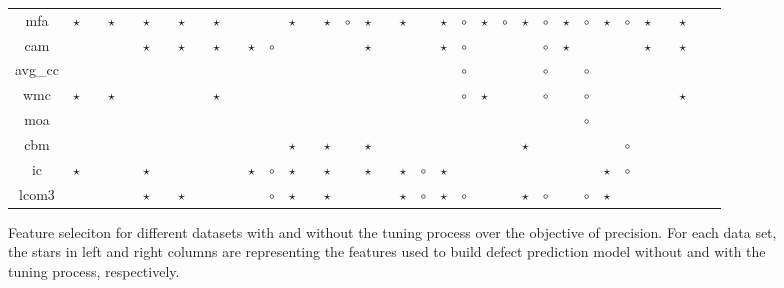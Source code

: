 \begin{figure*}[!ht]
\begin{tabular}{c|c c|c c|c c|c c|c c|c c|c c|c c|c c|c c|c c|c c|c c|c c|c c|c c|c c|c }
mfa& $\star$& & $\star$& & $\star$& & $\star$& & $\star$& & & & $\star$& & $\star$& $\circ$& $\star$& & $\star$& & $\star$& $\circ$& $\star$& $\circ$& $\star$& $\circ$& $\star$& $\circ$& $\star$& $\circ$& $\star$& & $\star$& \\
cam& & & & & $\star$& & $\star$& & $\star$& & $\star$& $\circ$& & & & & $\star$& & & & $\star$& $\circ$& & & & $\circ$& $\star$& & & & $\star$& & $\star$& \\
avg\_cc& & & & & & & & & & & & & & & & & & & & & & $\circ$& & & & $\circ$& & $\circ$& & & & & & \\
wmc& $\star$& & $\star$& & & & & & $\star$& & & & & & & & & & & & & $\circ$& $\star$& & & $\circ$& & $\circ$& & & & & $\star$& \\
moa& & & & & & & & & & & & & & & & & & & & & & & & & & & & $\circ$& & & & & & \\
cbm& & & & & & & & & & & & & $\star$& & $\star$& & $\star$& & & & & & & & $\star$& & & & & $\circ$& & & & \\
ic& $\star$& & & & $\star$& & & & & & $\star$& $\circ$& $\star$& & $\star$& & $\star$& & $\star$& $\circ$& $\star$& & & & & & & & $\star$& $\circ$& & & & \\
lcom3& & & & & $\star$& & $\star$& & & & & $\circ$& $\star$& & $\star$& & & & $\star$& $\circ$& $\star$& $\circ$& & & $\star$& $\circ$& & $\circ$& $\star$& & & & & \\

  \end{tabular}
  \caption{Feature seleciton for different datasets with and without the tuning process over the objective of precision. For each data set, the stars in left and right columns are representing the features used to build defect prediction model without and with the tuning process, respectively.}
\end{figure*}




